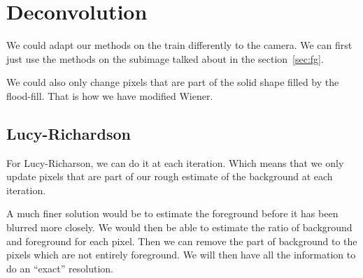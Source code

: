 \section{Deconvolution}
We could adapt our methods on the train differently to the camera.
We can first just use the methods on the subimage
talked about in the section~\ref{sec:fg}.

We could also only change pixels that are part of the solid
shape filled by the flood-fill.
That is how we have modified Wiener.

\subsection{Lucy-Richardson}
For Lucy-Richarson, we can do it at each iteration.
Which means that we only update pixels that are part of our
rough estimate of the background at each iteration.

A much finer solution would be to estimate the foreground
before it has been blurred more closely.
We would then be able to estimate the ratio of background
and foreground for each pixel.
Then we can remove the part of background to the pixels
which are not entirely foreground.
We will then have all the information to do an ``exact''
resolution.
